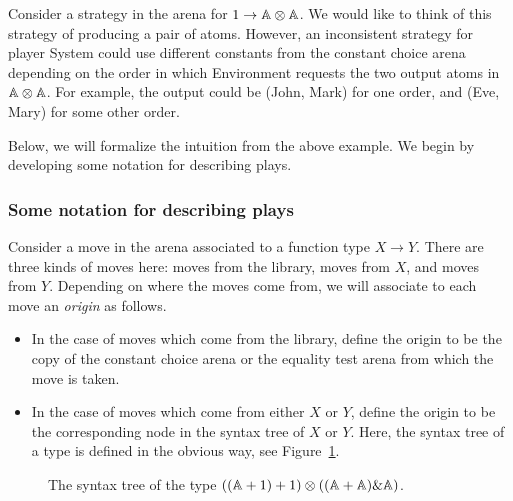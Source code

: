 \begin{example} \label{ex:inconsistent-strategy} Consider a strategy in the arena for  $1 \to \mathbb A \otimes \mathbb A$. We would like to think of this strategy of producing a pair of atoms. 
     However, an inconsistent strategy for player System could use different constants from the constant choice arena  depending on the order in which Environment requests the two output atoms in $\mathbb A \otimes \mathbb A$.  For example, the output could be (John, Mark) for one order, and (Eve, Mary) for some other order.  \exampleend
\end{example}

Below, we will formalize the intuition from the above example. We begin by developing some notation for describing plays.





\subsubsection{Some notation for describing plays}
\label{sec:some-notation-for-describing-plays}
Consider a move in the arena associated to a function type $X \to Y$. There are three kinds of moves here: moves from the library, moves from $X$, and moves from $Y$. Depending on where the moves come from, we will associate to each move an \emph{origin} as follows. 
\begin{itemize}
    \item In the case of moves which come from the library, define the  {origin} to be the copy of the constant choice arena or the equality test arena from which the move is taken.
    \item   In the case of moves which come from either $X$ or $Y$, define the origin to be the corresponding node in the syntax tree of $X$ or $Y$. Here, the syntax tree of a type is defined in the obvious way, see Figure~\ref{fig:syntax-tree}.
\end{itemize}


\begin{figure}
    \caption{\label{fig:syntax-tree} The syntax tree of the type $((\mathbb A +1) + 1) \otimes ((\mathbb A + \mathbb A) \& \mathbb A)$.}
\end{figure}


